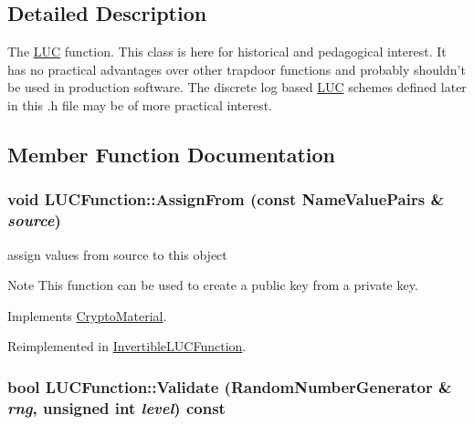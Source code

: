 \subsection{Detailed Description}
The \hyperlink{struct_l_u_c}{LUC} function. This class is here for historical and pedagogical interest. It has no practical advantages over other trapdoor functions and probably shouldn't be used in production software. The discrete log based \hyperlink{struct_l_u_c}{LUC} schemes defined later in this .h file may be of more practical interest. 

\subsection{Member Function Documentation}
\hypertarget{class_l_u_c_function_af6a95ed660e53a5fa07841f139d43ccf}{
\subsubsection[{AssignFrom}]{\setlength{\rightskip}{0pt plus 5cm}void LUCFunction::AssignFrom (const {\bf NameValuePairs} \& {\em source})}}
\label{class_l_u_c_function_af6a95ed660e53a5fa07841f139d43ccf}


assign values from source to this object \begin{DoxyNote}{Note}
This function can be used to create a public key from a private key. 
\end{DoxyNote}


Implements \hyperlink{class_crypto_material_a20181c1b39a74a9fe91385b025b773c6}{CryptoMaterial}.

Reimplemented in \hyperlink{class_invertible_l_u_c_function_aaaef1b335de1f76ec61079d1dfd78744}{InvertibleLUCFunction}.\hypertarget{class_l_u_c_function_a9bc1b75db5e2b09dd2d7cbf0e9801bf8}{
\subsubsection[{Validate}]{\setlength{\rightskip}{0pt plus 5cm}bool LUCFunction::Validate ({\bf RandomNumberGenerator} \& {\em rng}, \/  unsigned int {\em level}) const}}
\label{class_l_u_c_function_a9bc1b75db5e2b09dd2d7cbf0e9801bf8}



